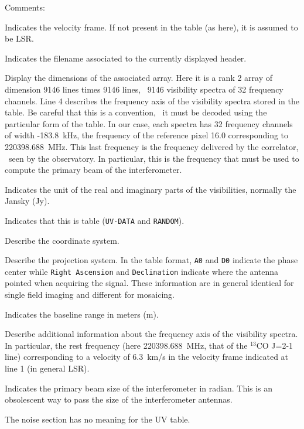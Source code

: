 Comments:
\begin{description}\itemsep 0pt
\item[Line 1] Indicates the velocity frame. If not present in the table
(as here), it is assumed to be LSR.
\item[Line 2] Indicates the filename associated to the currently displayed
  header.
\item[Lines 3-5] Display the dimensions of the associated array. Here it is
  a rank 2 array of dimension 9146 lines times 9146 lines, \ie\ 9146 
  visibility spectra of 32 frequency channels.  Line
  4 describes the frequency axis of the visibility spectra stored in the
  \uv{} table. Be careful that this is a convention, \ie\ it must be
  decoded using the particular form of the table. In our case, each spectra
  has 32 frequency channels of width -183.8~kHz, the frequency of the
  reference pixel 16.0 corresponding to 220398.688~MHz. This last
  frequency is the frequency delivered by the correlator, \ie\ seen by the
  observatory. In particular, this is the frequency that must be used to
  compute the primary beam of the interferometer.
\item[Line 8] Indicates the unit of the real and imaginary parts of the
  visibilities, normally the Jansky (Jy).
\item[Line 9] Indicates that this is \uv{} table (\texttt{UV-DATA} and
  \texttt{RANDOM}).
\item[Lines 10-13] Describe the coordinate system.
\item[Lines 14-15] Describe the projection system. In the \uv{} table
  format, \texttt{A0} and \texttt{D0} indicate the phase center while
  \texttt{Right Ascension} and \texttt{Declination} indicate where the
  antenna pointed when acquiring the signal. These information are in
  general identical for single field imaging and different for mosaicing.
\item[Lines 16] Indicates the baseline range in meters (m). 
\item[Lines 17-19] Describe additional information about the frequency axis
  of the visibility spectra. In particular, the rest frequency (here
  220398.688~MHz, that of the $^{13}$CO J=2-1 line) corresponding to a 
  velocity of 6.3~km/s in the velocity frame indicated at line 1 (in general LSR).
\item[Line 20] Indicates the primary beam size of the interferometer in
  radian. This is an obsolescent way to pass the size of the interferometer
  antennas.
\item[Line 21] The noise section has no meaning for the UV table.

\end{description}
